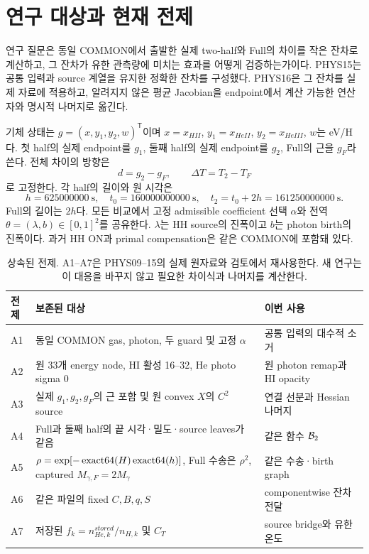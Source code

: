 \section{연구 대상과 현재 전제}\label{sec:scope}
연구 질문은 동일 COMMON에서 출발한 실제 two-half와 Full의 차이를 작은 잔차로 계산하고, 그 잔차가 유한 관측량에 미치는 효과를 어떻게 검증하는가이다. PHYS15는 공통 입력과 source 계열을 유지한 정확한 잔차를 구성했다. PHYS16은 그 잔차를 실제 자료에 적용하고, 알려지지 않은 평균 Jacobian을 endpoint에서 계산 가능한 연산자와 명시적 나머지로 옮긴다.

기체 상태는 $g=(x,y_1,y_2,w)^{\mathsf T}$이며 $x=x_{HII}$, $y_1=x_{HeII}$, $y_2=x_{HeIII}$, $w$는 eV/H다. 첫 half의 실제 endpoint를 $g_1$, 둘째 half의 실제 endpoint를 $g_2$, Full의 근을 $g_F$라 쓴다. 전체 차이의 방향은
\begin{equation}
d=g_2-g_F,\qquad \Delta T=T_2-T_F
\label{eq:direction}
\end{equation}
로 고정한다. 각 half의 길이와 원 시각은
\begin{equation}
h=625000000\ \mathrm s,\quad t_0=160000000000\ \mathrm s,
\quad t_2=t_0+2h=161250000000\ \mathrm s.
\label{eq:time}
\end{equation}
Full의 길이는 $2h$다. 모든 비교에서 고정 admissible coefficient 선택 $\alpha$와 전역 $\theta=(\lambda,b)\in[0,1]^2$를 공유한다. $\lambda$는 HH source의 진폭이고 $b$는 photon birth의 진폭이다. 과거 HH ON과 primal compensation은 같은 COMMON에 포함돼 있다.

\begin{table}[H]
\centering\small
\begin{tabularx}{\textwidth}{@{}p{12mm}X p{45mm}@{}}
\toprule
전제 & 보존된 대상 & 이번 사용\\\midrule
A1 & 동일 COMMON gas, photon, 두 guard 및 고정 $\alpha$ & 공통 입력의 대수적 소거\\
A2 & 원 33개 energy node, HI 활성 16--32, He photo sigma 0 & 원 photon remap과 HI opacity\\
A3 & 실제 $g_1,g_2,g_F$의 근 포함 및 원 convex $X$의 $C^2$ source & 연결 선분과 Hessian 나머지\\
A4 & Full과 둘째 half의 끝 시각·밀도·source leaves가 같음 & 같은 함수 $\mathcal B_2$\\
A5 & $\rho=\exp[-\operatorname{exact64}(H)\operatorname{exact64}(h)]$, Full 수송은 $\rho^2$, captured $M_{\gamma,F}=2M_\gamma$ & 같은 수송·birth graph\\
A6 & 같은 파일의 fixed $C,B,q,S$ & componentwise 잔차 전달\\
A7 & 저장된 $f_k=n_{He,k}^{stored}/n_{H,k}$ 및 $C_T$ & source bridge와 유한 온도\\
\bottomrule
\end{tabularx}
\caption{상속된 전제. A1--A7은 PHYS09--15의 실제 원자료와 검토에서 재사용한다. 새 연구는 이 대응을 바꾸지 않고 필요한 차이식과 나머지를 계산한다.}
\label{tab:premises}
\end{table}

